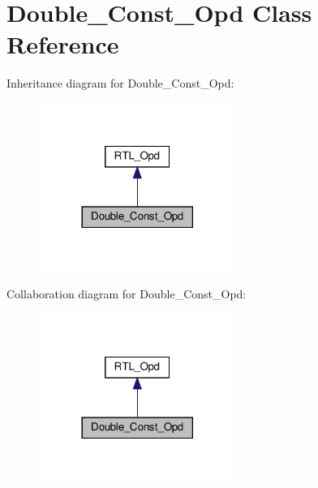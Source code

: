 \hypertarget{classDouble__Const__Opd}{}\section{Double\+\_\+\+Const\+\_\+\+Opd Class Reference}
\label{classDouble__Const__Opd}


Inheritance diagram for Double\+\_\+\+Const\+\_\+\+Opd\+:
\nopagebreak
\begin{figure}[H]
\begin{center}
\leavevmode
\includegraphics[width=182pt]{classDouble__Const__Opd__inherit__graph}
\end{center}
\end{figure}


Collaboration diagram for Double\+\_\+\+Const\+\_\+\+Opd\+:
\nopagebreak
\begin{figure}[H]
\begin{center}
\leavevmode
\includegraphics[width=182pt]{classDouble__Const__Opd__coll__graph}
\end{center}
\end{figure}
